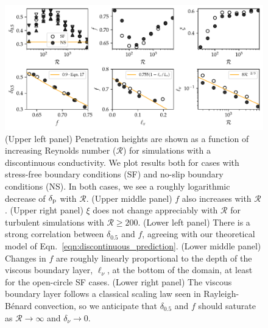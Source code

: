 \documentclass[twocolumn]{aastex631}
\newcommand{\delp}{\ensuremath{\delta_{\rm{p}}}}
\newcommand{\mR}{\ensuremath{\mathcal{R}}}
\begin{document}
\begin{figure}[t]
\centering
\includegraphics[width=\textwidth]{parameters_vs_re.pdf}
\caption{
(Upper left panel) Penetration heights are shown as a function of increasing Reynolds number ($\mR$) for simulations with a discontinuous conductivity.
We plot results both for cases with stress-free boundary conditions (SF) and no-slip boundary conditions (NS).
In both cases, we see a roughly logarithmic decrease of $\delp$ with $\mR$.
(Upper middle panel) $f$ also increases with $\mR$.
(Upper right panel) $\xi$ does not change appreciably with $\mR$ for turbulent simulations with $\mR \geq 200$.
(Lower left panel) There is a strong correlation between $\delta_{0.5}$ and $f$, agreeing with our theoretical model of Eqn.~\ref{eqn:discontinuous_prediction}.
(Lower middle panel) Changes in $f$ are roughly linearly proportional to the depth of the viscous boundary layer, $\ell_\nu$, at the bottom of the domain, at least for the open-circle SF cases.
(Lower right panel) The viscous boundary layer follows a classical scaling law seen in Rayleigh-B\'{e}nard convection, so we anticipate that $\delta_{0.5}$ and $f$ should saturate as $\mR \rightarrow \infty$ and $\delta_{\nu} \rightarrow 0$.
\label{fig:parameters_vs_re}
}
\end{figure}
\end{document}
